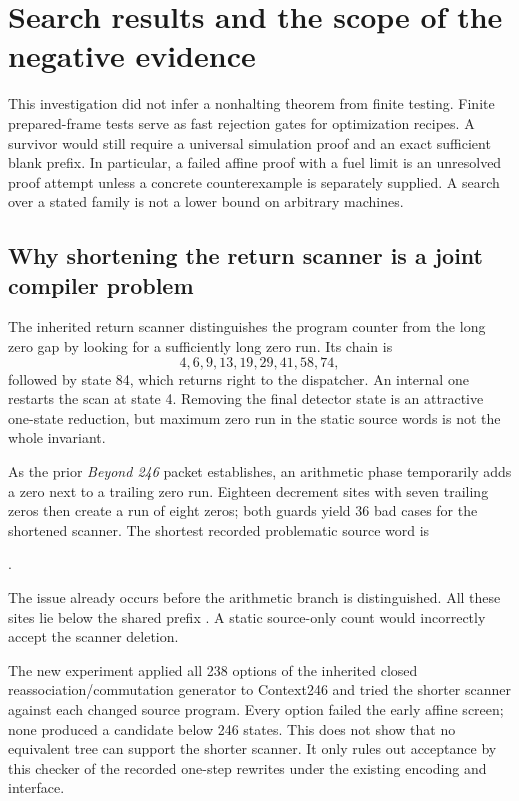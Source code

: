\section{Search results and the scope of the negative evidence}
\label{sec:search}

This investigation did not infer a nonhalting theorem from finite testing.
Finite prepared-frame tests serve as fast rejection gates for optimization
recipes. A survivor would still require a universal simulation proof and
an exact sufficient blank prefix. In particular, a failed affine proof
with a fuel limit is an unresolved proof attempt unless a concrete
counterexample is separately supplied. A search over a stated family is
not a lower bound on arbitrary machines.

\subsection{Why shortening the return scanner is a joint compiler problem}

The inherited return scanner distinguishes the program counter from the
long zero gap by looking for a sufficiently long zero run. Its chain is
\[
4,6,9,13,19,29,41,58,74,
\]
followed by state 84, which returns right to the dispatcher. An internal
one restarts the scan at state 4. Removing the final detector state is
an attractive one-state reduction, but maximum zero run in the static
source words is not the whole invariant.

As the prior \emph{Beyond 246} packet establishes, an arithmetic phase
temporarily adds a zero next to a trailing zero run. Eighteen decrement
sites with seven trailing zeros then create a run of eight zeros;
both guards yield 36 bad cases for the shortened scanner. The shortest
recorded problematic source word is
\begin{center}.\end{center}
The issue already occurs before the arithmetic branch is distinguished.
All these sites lie below the shared prefix
. A static source-only count would incorrectly accept
the scanner deletion.

The new experiment applied all 238 options of the inherited closed
reassociation/commutation generator to Context246 and tried the shorter
scanner against each changed source program. Every option failed the
early affine screen; none produced a candidate below 246 states. This
does not show that no equivalent tree can support the shorter scanner.
It only rules out acceptance by this checker of the recorded one-step
rewrites under the existing encoding and interface.

